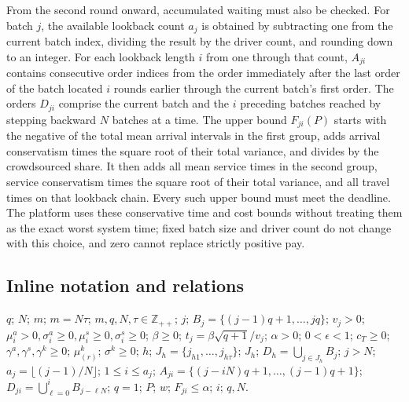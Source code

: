 \documentclass[10pt]{article}
\begin{document}
From the second round onward, accumulated waiting must also be checked. For batch $j$, the available lookback count $a_j$ is obtained by subtracting one from the current batch index, dividing the result by the driver count, and rounding down to an integer. For each lookback length $i$ from one through that count, $A_{ji}$ contains consecutive order indices from the order immediately after the last order of the batch located $i$ rounds earlier through the current batch's first order. The orders $D_{ji}$ comprise the current batch and the $i$ preceding batches reached by stepping backward $N$ batches at a time. The upper bound $F_{ji}(P)$ starts with the negative of the total mean arrival intervals in the first group, adds arrival conservatism times the square root of their total variance, and divides by the crowdsourced share. It then adds all mean service times in the second group, service conservatism times the square root of their total variance, and all travel times on that lookback chain. Every such upper bound must meet the deadline. The platform uses these conservative time and cost bounds without treating them as the exact worst system time; fixed batch size and driver count do not change with this choice, and zero cannot replace strictly positive pay.

\subsection*{Inline notation and relations}
$q$; $N$; $m$; $m=N\tau$; $m,q,N,\tau\in\mathbb Z_{++}$; $j$; $B_j=\{(j-1)q+1,\ldots,jq\}$; $v_j>0$; $\mu_i^a>0,\sigma_i^a\ge0,\mu_i^s\ge0,\sigma_i^s\ge0$; $\beta\ge0$; $t_j=\beta\sqrt{q+1}/v_j$; $\alpha>0$; $0<\epsilon<1$; $c_T\ge0$; $\gamma^a,\gamma^s,\gamma^k\ge0$; $\mu_{(r)}^k$; $\sigma^k\ge0$; $h$; $J_h=\{j_{h1},\ldots,j_{h\tau}\}$; $J_h$; $D_h=\bigcup_{j\in J_h}B_j$; $j>N$; $a_j=\lfloor(j-1)/N\rfloor$; $1\le i\le a_j$; $A_{ji}=\{(j-iN)q+1,\ldots,(j-1)q+1\}$; $D_{ji}=\bigcup_{\ell=0}^{i}B_{j-\ell N}$; $q=1$; $P$; $w$; $F_{ji}\le\alpha$; $i$; $q,N$.
\end{document}
